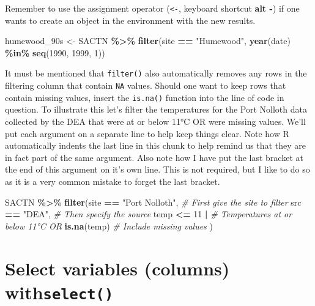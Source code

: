 \documentclass[
]{book}
\newenvironment{Shaded}{\begin{snugshade}}{\end{snugshade}}
\newcommand{\CommentTok}[1]{\textcolor[rgb]{0.56,0.35,0.01}{\textit{#1}}}
\newcommand{\DecValTok}[1]{\textcolor[rgb]{0.00,0.00,0.81}{#1}}
\newcommand{\KeywordTok}[1]{\textcolor[rgb]{0.13,0.29,0.53}{\textbf{#1}}}
\newcommand{\NormalTok}[1]{#1}
\newcommand{\OperatorTok}[1]{\textcolor[rgb]{0.81,0.36,0.00}{\textbf{#1}}}
\newcommand{\StringTok}[1]{\textcolor[rgb]{0.31,0.60,0.02}{#1}}
\begin{document}
Remember to use the assignment operator (\texttt{\textless{}-}, keyboard shortcut \textbf{alt -}) if one wants to create an object in the environment with the new results.

\begin{Shaded}
\begin{Highlighting}[]
\NormalTok{humewood\_90s <{-}}\StringTok{ }\NormalTok{SACTN }\OperatorTok{\%>\%}\StringTok{ }
\StringTok{  }\KeywordTok{filter}\NormalTok{(site }\OperatorTok{==}\StringTok{ "Humewood"}\NormalTok{, }\KeywordTok{year}\NormalTok{(date) }\OperatorTok{\%in\%}\StringTok{ }\KeywordTok{seq}\NormalTok{(}\DecValTok{1990}\NormalTok{, }\DecValTok{1999}\NormalTok{, }\DecValTok{1}\NormalTok{))}
\end{Highlighting}
\end{Shaded}

It must be mentioned that \texttt{filter()} also automatically removes any rows in the filtering column that contain \texttt{NA} values. Should one want to keep rows that contain missing values, insert the \texttt{is.na()} function into the line of code in question. To illustrate this let's filter the temperatures for the Port Nolloth data collected by the DEA that were at or below 11°C OR were missing values. We'll put each argument on a separate line to help keep things clear. Note how R automatically indents the last line in this chunk to help remind us that they are in fact part of the same argument. Also note how I have put the last bracket at the end of this argument on it's own line. This is not required, but I like to do so as it is a very common mistake to forget the last bracket.

\begin{Shaded}
\begin{Highlighting}[]
\NormalTok{SACTN }\OperatorTok{\%>\%}\StringTok{ }
\StringTok{  }\KeywordTok{filter}\NormalTok{(site }\OperatorTok{==}\StringTok{ "Port Nolloth"}\NormalTok{, }\CommentTok{\# First give the site to filter}
\NormalTok{         src }\OperatorTok{==}\StringTok{ "DEA"}\NormalTok{, }\CommentTok{\# Then specify the source}
\NormalTok{         temp }\OperatorTok{<=}\StringTok{ }\DecValTok{11} \OperatorTok{|}\StringTok{ }\CommentTok{\# Temperatures at or below 11°C OR}
\StringTok{           }\KeywordTok{is.na}\NormalTok{(temp) }\CommentTok{\# Include missing values}
\NormalTok{         )}
\end{Highlighting}
\end{Shaded}

\hypertarget{select-variables-columns-withselect}{%
\section{\texorpdfstring{Select variables (columns) with\texttt{select()}}{Select variables (columns) withselect()}}\label{select-variables-columns-withselect}}
\end{document}
